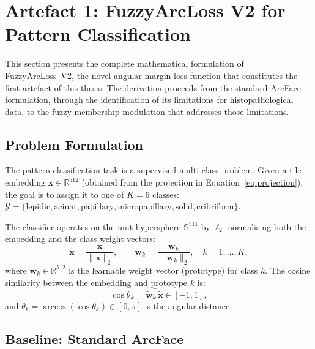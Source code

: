 \section{Artefact 1: FuzzyArcLoss V2 for Pattern Classification}
\label{sec:meth:pattern_classifier}

This section presents the complete mathematical formulation of FuzzyArcLoss~V2, the novel angular margin loss function that constitutes the first artefact of this thesis.
The derivation proceeds from the standard ArcFace formulation, through the identification of its limitations for histopathological data, to the fuzzy membership modulation that addresses those limitations.

\subsection{Problem Formulation}
\label{sec:meth:pattern:problem}

The pattern classification task is a supervised multi-class problem.
Given a tile embedding $\mathbf{x} \in \mathbb{R}^{512}$ (obtained from the projection in Equation~\ref{eq:projection}), the goal is to assign it to one of $K = 6$ classes: $\mathcal{Y} = \{\text{lepidic}, \text{acinar}, \text{papillary}, \text{micropapillary}, \text{solid}, \text{cribriform}\}$.


The classifier operates on the unit hypersphere $\mathbb{S}^{511}$ by $\ell_2$-normalising both the embedding and the class weight vectors:
\begin{equation}
\label{eq:normalisation}
\tilde{\mathbf{x}} = \frac{\mathbf{x}}{\|\mathbf{x}\|_2}, \qquad \tilde{\mathbf{w}}_k = \frac{\mathbf{w}_k}{\|\mathbf{w}_k\|_2}, \quad k = 1, \ldots, K,
\end{equation}
where $\mathbf{w}_k \in \mathbb{R}^{512}$ is the learnable weight vector (prototype) for class $k$.
The cosine similarity between the embedding and prototype $k$ is:
\begin{equation}
\label{eq:cosine_sim}
\cos\theta_k = \tilde{\mathbf{w}}_k^\top \tilde{\mathbf{x}} \in [-1, 1],
\end{equation}
and $\theta_k = \arccos(\cos\theta_k) \in [0, \pi]$ is the angular distance.

\subsection{Baseline: Standard ArcFace}
\label{sec:meth:pattern:arcface}

